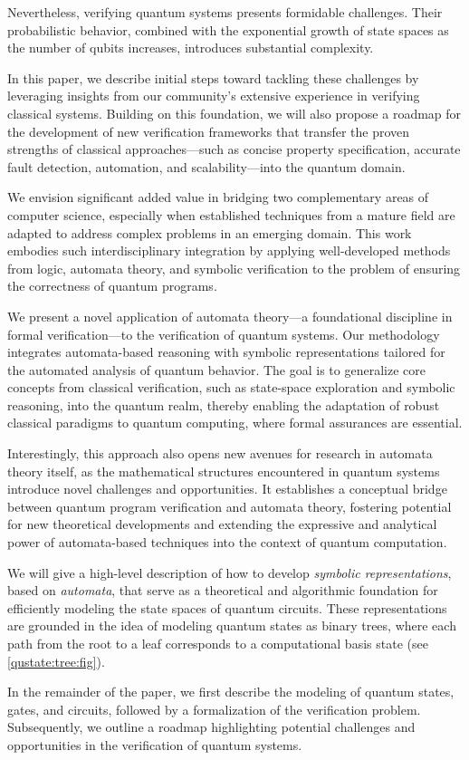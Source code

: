 Nevertheless, verifying quantum systems presents formidable challenges. Their probabilistic behavior, combined with the exponential growth of state spaces as the number of qubits increases, introduces substantial complexity. %

In this paper, we describe initial steps toward tackling these challenges by leveraging insights from our community's extensive experience in verifying classical systems. %
Building on this foundation, we will also propose a roadmap for the development of new verification frameworks that transfer the proven strengths of classical approaches—such as concise property specification, accurate fault detection, automation, and scalability—into the quantum domain.

We envision significant added value in bridging two complementary areas of computer science, especially when established techniques from a mature field are adapted to address complex problems in an emerging domain.
%
This work embodies such interdisciplinary integration by applying well-developed methods from logic, automata theory, and symbolic verification to the problem of ensuring the correctness of quantum programs.
%
 
We present a novel application of automata theory—a foundational discipline in formal verification—to the verification of quantum systems.
%
Our methodology integrates automata-based reasoning with symbolic representations tailored for the automated analysis of quantum behavior.
%
The goal is to generalize core concepts from classical verification, such as state-space exploration and symbolic reasoning, into the quantum realm, thereby enabling the adaptation of robust classical paradigms to quantum computing, where formal assurances are essential.
%

Interestingly, this approach also opens new avenues for research in automata theory itself, as the mathematical structures encountered in quantum systems introduce novel challenges and opportunities.
%
It establishes a conceptual bridge between quantum program verification and automata theory, fostering potential for new theoretical developments and extending the expressive and analytical power of automata-based techniques into the context of quantum computation.
%


We will give a high-level description  of how to  develop {\it symbolic representations}, based on {\it automata}, that serve as a theoretical and algorithmic foundation for efficiently modeling the state spaces of quantum circuits. These representations are grounded in the idea of modeling quantum states as binary trees, where each path from the root to a leaf corresponds to a computational basis state (see \cref{qustate:tree:fig}). 

In the remainder of the paper, we first describe the modeling of quantum states, gates, and circuits, followed by a formalization of the verification problem.
Subsequently, we outline a roadmap highlighting potential challenges and opportunities in the verification of quantum systems.
